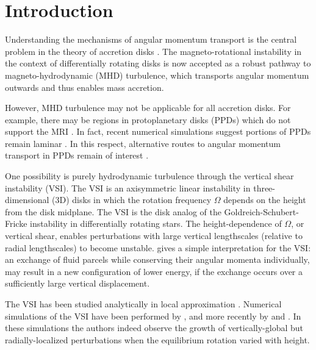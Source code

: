 \documentclass[iop]{emulateapj}
\begin{document}
\section{Introduction}
Understanding the mechanisms of angular momentum transport is the
central problem in the theory of accretion disks 
\citep{lyndenbell74}. The   
magneto-rotational instability in the context of differentially
rotating disks \citep[MRI,][]{balbus91} is now accepted as a robust
pathway to magneto-hydrodynamic (MHD) turbulence, which transports
angular momentum outwards and thus enables mass accretion. 

However, MHD turbulence may not be applicable for all  
accretion disks. For example, there may be regions in protoplanetary  
disks (PPDs) which do not support the MRI 
\citep{gammie96,landry13}. In fact, recent  numerical simulations
suggest portions of PPDs remain laminar \citep[e.g.][and references
therein]{lesur14,bai15,gressel15}. In this respect, alternative routes 
to angular momentum transport in PPDs remain of interest
\citep{armitage10}. 
 
One possibility is purely hydrodynamic turbulence through the vertical
shear instability (VSI). The VSI is an axisymmetric linear instability
in three-dimensional (3D) disks in which the rotation frequency
$\Omega$ depends on the height from the disk midplane. The VSI is the
disk analog of the Goldreich-Schubert-Fricke instability
\citep[GSF,][]{goldreich67,fricke68} in differentially rotating stars.   
The height-dependence of $\Omega$, or vertical shear, enables
perturbations with large vertical lengthscales (relative to radial
lengthscales) to become unstable.    
\cite{umurhan13} gives a simple interpretation for the VSI: an
exchange of fluid parcels while conserving their angular momenta
individually, may result in a new configuration of lower energy, if
the exchange occurs over a sufficiently large vertical displacement.   


The VSI has been studied analytically in local approximation
\citep{urpin98,urpin03}. Numerical simulations of the  
VSI have been performed by \cite{arlt04}, and more recently by 
\cite{nelson13} and \cite{stoll14}. In these simulations the authors indeed observe the
growth of vertically-global but radially-localized perturbations when
the equilibrium rotation varied with height.  
\end{document}
